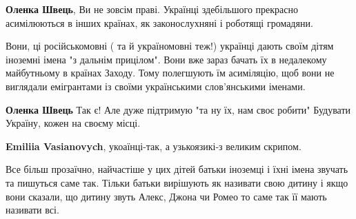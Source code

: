 \begin{itemize}
\begin{itemize}
 
\textbf{Оленка Швець}, Ви не зовсім праві. Українці здебільшого прекрасно асимілюються в інших країнах, як законослухняні і роботящі громадяни.

 

Вони, ці російськомовні ( та й україномовні теж!) українці дають своїм дітям
іноземні імена "з дальнім прицілом". Вони вже зараз бачать їх в недалекому
майбутньому в країнах Заходу. Тому полегшують їм асиміляцію, щоб вони не
виглядали емігрантами із своїми українськими слов'янськими іменами.


 
\textbf{Оленка Швець} Так є! Але дуже підтримую "та ну їх, нам своє робити" Будувати Україну, кожен на своєму місці.

 
\textbf{Emiliia Vasianovych}, укоаїнці-так, а узькоязикі-з великим скрипом.
\end{itemize}

 

Все більш прозаїчно, найчастіше у цих дітей батьки іноземці і їхні імена
звучать та пишуться саме так. Тільки батьки вирішують як називати свою дитину і
якщо вони сказали, що дитину звуть Алекс, Джона чи Ромео то саме так її мають
називати всі.


\end{itemize}
